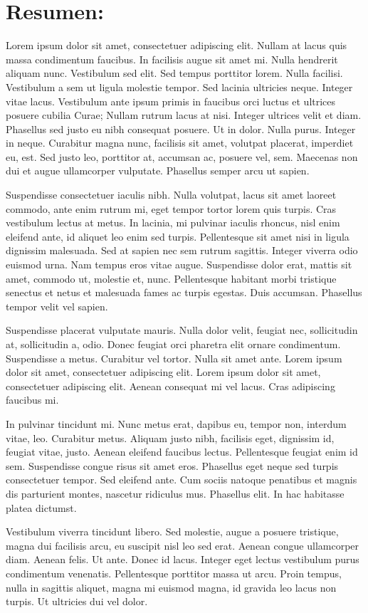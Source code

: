 %
%

\section*{Resumen:}

Lorem ipsum dolor sit amet, consectetuer adipiscing elit. Nullam at lacus quis massa condimentum faucibus. In facilisis augue sit amet mi. Nulla hendrerit aliquam nunc. Vestibulum sed elit. Sed tempus porttitor lorem. Nulla facilisi. Vestibulum a sem ut ligula molestie tempor. Sed lacinia ultricies neque. Integer vitae lacus. Vestibulum ante ipsum primis in faucibus orci luctus et ultrices posuere cubilia Curae; Nullam rutrum lacus at nisi. Integer ultrices velit et diam. Phasellus sed justo eu nibh consequat posuere. Ut in dolor. Nulla purus. Integer in neque. Curabitur magna nunc, facilisis sit amet, volutpat placerat, imperdiet eu, est. Sed justo leo, porttitor at, accumsan ac, posuere vel, sem. Maecenas non dui et augue ullamcorper vulputate. Phasellus semper arcu ut sapien.

Suspendisse consectetuer iaculis nibh. Nulla volutpat, lacus sit amet laoreet commodo, ante enim rutrum mi, eget tempor tortor lorem quis turpis. Cras vestibulum lectus at metus. In lacinia, mi pulvinar iaculis rhoncus, nisl enim eleifend ante, id aliquet leo enim sed turpis. Pellentesque sit amet nisi in ligula dignissim malesuada. Sed at sapien nec sem rutrum sagittis. Integer viverra odio euismod urna. Nam tempus eros vitae augue. Suspendisse dolor erat, mattis sit amet, commodo ut, molestie et, nunc. Pellentesque habitant morbi tristique senectus et netus et malesuada fames ac turpis egestas. Duis accumsan. Phasellus tempor velit vel sapien.

Suspendisse placerat vulputate mauris. Nulla dolor velit, feugiat nec, sollicitudin at, sollicitudin a, odio. Donec feugiat orci pharetra elit ornare condimentum. Suspendisse a metus. Curabitur vel tortor. Nulla sit amet ante. Lorem ipsum dolor sit amet, consectetuer adipiscing elit. Lorem ipsum dolor sit amet, consectetuer adipiscing elit. Aenean consequat mi vel lacus. Cras adipiscing faucibus mi.

In pulvinar tincidunt mi. Nunc metus erat, dapibus eu, tempor non, interdum vitae, leo. Curabitur metus. Aliquam justo nibh, facilisis eget, dignissim id, feugiat vitae, justo. Aenean eleifend faucibus lectus. Pellentesque feugiat enim id sem. Suspendisse congue risus sit amet eros. Phasellus eget neque sed turpis consectetuer tempor. Sed eleifend ante. Cum sociis natoque penatibus et magnis dis parturient montes, nascetur ridiculus mus. Phasellus elit. In hac habitasse platea dictumst.

Vestibulum viverra tincidunt libero. Sed molestie, augue a posuere tristique, magna dui facilisis arcu, eu suscipit nisl leo sed erat. Aenean congue ullamcorper diam. Aenean felis. Ut ante. Donec id lacus. Integer eget lectus vestibulum purus condimentum venenatis. Pellentesque porttitor massa ut arcu. Proin tempus, nulla in sagittis aliquet, magna mi euismod magna, id gravida leo lacus non turpis. Ut ultricies dui vel dolor.
